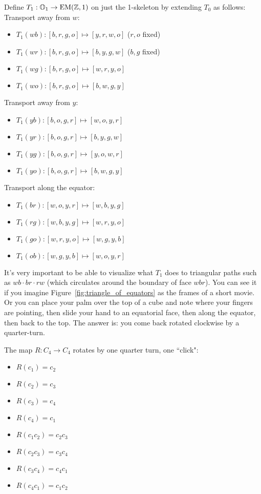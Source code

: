 \begin{mydef}
Define \( T_1:\mathbb{O}_1\to\mathrm{EM}(\mathbb{Z},1) \) on just the 1-skeleton by extending \( T_0 \) as follows:
Transport away from \( w \):
\begin{itemize}
\item \( T_1(wb):[b, r, g, o]\mapsto [y, r, w, o] \) (\( r, o \) fixed)
\item \( T_1(wr):[b, r, g, o]\mapsto [b, y, g, w] \) (\( b, g \) fixed)
\item \( T_1(wg):[b, r, g, o]\mapsto [w, r, y, o] \)
\item \( T_1(wo):[b, r, g, o]\mapsto [b, w, g, y] \)
\end{itemize}
Transport away from \( y \):
\begin{itemize}
\item \( T_1(yb):[b, o, g, r]\mapsto [w, o, y, r] \)
\item \( T_1(yr):[b, o, g, r]\mapsto [b, y, g, w] \)
\item \( T_1(yg):[b, o, g, r]\mapsto [y, o, w, r] \)
\item \( T_1(yo):[b, o, g, r]\mapsto [b, w, g, y] \)
\end{itemize}
Transport along the equator:
\begin{itemize}
\item \( T_1(br):[w, o, y, r]\mapsto [w, b, y, g] \) 
\item \( T_1(rg):[w, b, y, g]\mapsto [w, r, y, o] \)
\item \( T_1(go):[w, r, y, o]\mapsto [w, g, y, b] \)
\item \( T_1(ob):[w, g, y, b]\mapsto [w, o, y, r] \)
\end{itemize}
\end{mydef}

It's very important to be able to visualize what \( T_1 \) does to triangular paths such as \( wb\cdot br\cdot rw \) (which circulates around the boundary of face \( wbr \)). You can see it if you imagine Figure~\ref{fig:triangle_of_equators} as the frames of a short movie. Or you can place your palm over the top of a cube and note where your fingers are pointing, then slide your hand to an equatorial face, then along the equator, then back to the top. The answer is: you come back rotated clockwise by a quarter-turn. 

\begin{mydef}
\label{def:octahedron_holonomy}
The map \( R:C_4\to C_4 \) rotates by one quarter turn, one ``click":
\begin{multicols}{2}
\begin{itemize}
\item \( R(c_1) = c_2 \)
\item \( R(c_2) = c_3 \)
\item \( R(c_3) = c_4 \)
\item \( R(c_4) = c_1 \)
\item \( R(c_1c_2) = c_2c_3 \)
\item \( R(c_2c_3) = c_3c_4 \)
\item \( R(c_3c_4) = c_4c_1 \)
\item \( R(c_4c_1) = c_1c_2 \)
\end{itemize}
\end{multicols}
\end{mydef}

